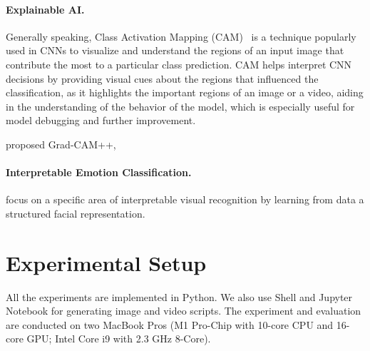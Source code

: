 \paragraph{Explainable AI.}

Generally speaking, 
Class Activation Mapping (CAM)~\cite{ZhouKLOT16} is a technique popularly used in CNNs to visualize and understand the regions of an input image that contribute the most to a particular class prediction. 
CAM helps interpret CNN decisions by providing visual cues about the regions that influenced the classification, 
as it highlights the important regions of an image or a video, 
aiding in the understanding of the behavior of the model, 
which is especially useful for model debugging and further improvement. 


\citet{chattopadhay2018grad} proposed Grad-CAM++,


\paragraph{Interpretable Emotion Classification.}

\citet{YinTLS019} focus on a specific area of interpretable visual recognition by learning from data a structured facial representation. 
\citet{Malik0R21} 

\section{Experimental Setup}
\label{sec:setup}

All the experiments are implemented in Python. 
We also use Shell and Jupyter Notebook for generating image and video scripts. 
The experiment and evaluation are conducted on two MacBook Pros 
(M1 Pro-Chip with 10-core CPU and 16-core GPU; Intel Core i9 with 2.3 GHz 8-Core). 

